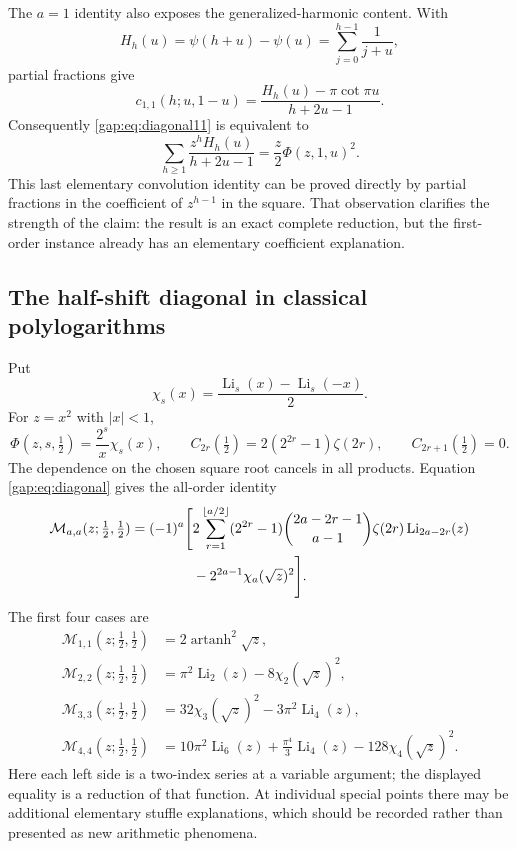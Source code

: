 \documentclass[11pt,letterpaper]{article}
\numberwithin{equation}{section}
\theoremstyle{plain}
\theoremstyle{definition}
\theoremstyle{remark}
\begin{document}
The $a=1$ identity also exposes the generalized-harmonic content.
With
\[
 H_h(u)=\psi(h+u)-\psi(u)=\sum_{j=0}^{h-1}\frac1{j+u},
\]
partial fractions give
\[
 c_{1,1}(h;u,1-u)
 =\frac{H_h(u)-\pi\cot\pi u}{h+2u-1}.
\]
Consequently \eqref{gap:eq:diagonal11} is equivalent to
\begin{equation}\label{gap:eq:harmonic-convolution}
 \sum_{h\geq1}\frac{z^h H_h(u)}{h+2u-1}
       =\frac z2\Phi(z,1,u)^2.
\end{equation}
This last elementary convolution identity can be proved directly by
partial fractions in the coefficient of $z^{h-1}$ in the square.
That observation clarifies the strength of the claim: the result is
an exact complete reduction, but the first-order instance already has
an elementary coefficient explanation.

\subsection{The half-shift diagonal in classical polylogarithms}

Put
\[
 \chi_s(x)=\frac{\operatorname{Li}_s(x)-\operatorname{Li}_s(-x)}2.
\]
For $z=x^2$ with $|x|<1$,
\[
 \Phi(z,s,\tfrac12)=\frac{2^s}{x}\chi_s(x),\qquad
 C_{2r}(\tfrac12)=2(2^{2r}-1)\zeta(2r),\qquad
 C_{2r+1}(\tfrac12)=0.
\]
The dependence on the chosen square root cancels in all products.
Equation \eqref{gap:eq:diagonal} gives the all-order identity
\begin{align}
 \mathcal M_{a,a}(z;\tfrac12,\tfrac12)
 =(-1)^a\Bigg[
 &2\sum_{r=1}^{\lfloor a/2\rfloor}
   (2^{2r}-1)\binom{2a-2r-1}{a-1}\zeta(2r)
                         \operatorname{Li}_{2a-2r}(z)\notag\\
 &-2^{2a-1}\chi_a(\sqrt z)^2\Bigg].
 \label{gap:eq:half-all}
\end{align}
The first four cases are
\begin{align}
 \mathcal M_{1,1}(z;\tfrac12,\tfrac12)
   &=2\operatorname{artanh}^2\sqrt z,\label{gap:eq:half11}\\
 \mathcal M_{2,2}(z;\tfrac12,\tfrac12)
   &=\pi^2\operatorname{Li}_2(z)-8\chi_2(\sqrt z)^2,
      \label{gap:eq:half22}\\
 \mathcal M_{3,3}(z;\tfrac12,\tfrac12)
   &=32\chi_3(\sqrt z)^2-3\pi^2\operatorname{Li}_4(z),
      \label{gap:eq:half33}\\
 \mathcal M_{4,4}(z;\tfrac12,\tfrac12)
   &=10\pi^2\operatorname{Li}_6(z)
       +\frac{\pi^4}{3}\operatorname{Li}_4(z)
       -128\chi_4(\sqrt z)^2.
      \label{gap:eq:half44}
\end{align}
Here each left side is a two-index series at a variable
argument; the displayed equality is a reduction of that function.
At individual special points there may be additional elementary
stuffle explanations, which should be recorded rather than presented
as new arithmetic phenomena.
\end{document}
